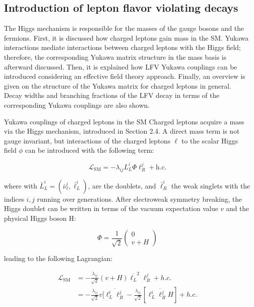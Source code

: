 \subsection{Introduction of lepton flavor violating decays}
The Higgs mechanism is responsible for the masses of the gauge bosons and the fermions. First, it is discussed how charged leptons gain mass in the SM. Yukawa interactions mediate interactions between charged leptons with the Higgs field; therefore, the corresponding Yukawa matrix structure in the mass basis is afterward discussed. Then, it is explained how LFV Yukawa couplings can be introduced considering an effective field theory approach. Finally, an overview is given on the structure of the Yukawa matrix for charged leptons in general. Decay widths and branching fractions of the LFV decay in terms of the corresponding Yukawa couplings are also shown.

Yukawa couplings of charged leptons in the SM Charged leptons acquire a mass via the Higgs mechanism, introduced in Section 2.4. A direct mass term is not gauge invariant, but interactions of the charged leptons $\ell$ to the scalar Higgs field $\phi$ can be introduced with the following term:

\begin{equation}
  \mathcal{L}_{\mathrm{SM}}=-\lambda_{i j} L_{L}^{i} \Phi \ell_{R}^{j}+\text {h.c.}
\end{equation}

where with $\bar{L}_{L}^{i}=(\bar{\nu}_{\ell}^{i}, \bar{\ell}_{L}^{i})$, are the \iso doublets, and $\bar{\ell}_{R}^{i}$ the weak singlets with the indices $i, j$ running over generations. After electroweak symmetry breaking, the Higgs doublet can be written in terms of the vacuum expectation value $v$ and the physical Higgs boson H:

\begin{equation}
  \Phi=\frac{1}{\sqrt{2}}\left(\begin{array}{c}0 \\ v+H \end{array}\right)
\end{equation}

leading to the following Lagrangian:

\begin{equation}
  \begin{aligned}
    \mathcal{L}_{\mathrm{SM}} &=-\frac{\lambda_{i j}}{\sqrt{2}}(v+H) \overline{\ell_{L}}^2 \ell_{R}^{j}+h.c. \\
    &=-\frac{\lambda_{i j}}{\sqrt{2}} v[\overline{\ell_{L}^{i} \ell_{R}^{j}}-\frac{\lambda_{i j}}{\sqrt{2}}[\overline{\ell_{L}^{i} \ell_{R}^{j} H}]+h.c.
  \end{aligned}
\end{equation}

